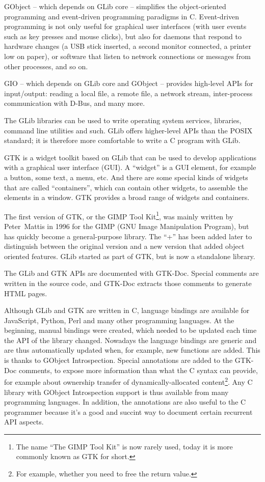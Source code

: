GObject -- which depends on GLib core -- simplifies the object-oriented programming and event-driven programming paradigms in C. Event-driven programming is not only useful for graphical user interfaces (with user events such as key presses and mouse clicks), but also for daemons that respond to hardware changes (a USB stick inserted, a second monitor connected, a printer low on paper), or software that listen to network connections or messages from other processes, and so on.

GIO -- which depends on GLib core and GObject -- provides high-level APIs for input/output: reading a local file, a remote file, a network stream, inter-process communication with D-Bus, and many more.

The GLib libraries can be used to write operating system services, libraries, command line utilities and such. GLib offers higher-level APIs than the POSIX standard; it is therefore more comfortable to write a C program with GLib.

GTK is a widget toolkit based on GLib that can be used to develop applications with a graphical user interface (GUI). A ``widget'' is a GUI element, for example a button, some text, a menu, etc. And there are some special kinds of widgets that are called ``containers'', which can contain other widgets, to assemble the elements in a window. GTK provides a broad range of widgets and containers.

The first version of GTK, or the GIMP Tool Kit\footnote{The name ``The GIMP Tool Kit'' is now rarely used, today it is more commonly known as GTK for short.}, was mainly written by Peter~Mattis in 1996 for the GIMP (GNU Image Manipulation Program), but has quickly become a general-purpose library. The ``+'' has been added later to distinguish between the original version and a new version that added object oriented features. GLib started as part of GTK, but is now a standalone library.

The GLib and GTK APIs are documented with GTK-Doc. Special comments are written in the source code, and GTK-Doc extracts those comments to generate HTML pages.

Although GLib and GTK are written in C, language bindings are available for JavaScript, Python, Perl and many other programming languages. At the beginning, manual bindings were created, which needed to be updated each time the API of the library changed. Nowadays the language bindings are generic and are thus automatically updated when, for example, new functions are added. This is thanks to GObject Introspection. Special annotations are added to the GTK-Doc comments, to expose more information than what the C syntax can provide, for example about ownership transfer of dynamically-allocated content\footnote{For example, whether you need to free the return value.}. Any C library with GObject Introspection support is thus available from many programming languages. In addition, the annotations are also useful to the C programmer because it's a good and succint way to document certain recurrent API aspects.

